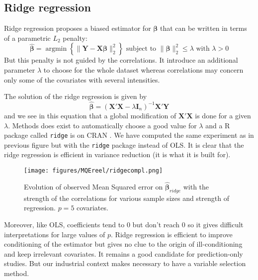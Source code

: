 \documentclass[12pt,a4paper]{report}
\begin{document}
		\subsection{Ridge regression}		%

Ridge regression \cite{hoerl1970ridge,marquardt1975ridge} proposes a biased estimator for $\boldsymbol{\beta}$ that can be written in terms of a parametric $L_2$ penalty:
	\begin{equation}
		 \boldsymbol{\hat{\beta}}=\operatorname{argmin} \left\lbrace \parallel \boldsymbol{Y}-\boldsymbol{X\beta}\parallel_2^2 \right\rbrace \textrm{ subject to } \parallel \boldsymbol{\beta} \parallel_2^2\leq \lambda \textrm{ with } \lambda>0
	\end{equation}
	But this penalty is not guided by the correlations. It introduce an additional parameter $\lambda$ to choose for the whole dataset  whereas correlations may concern only some of the covariates with several intensities.
	
	The solution of the ridge regression is given by
	\begin{equation}
		 \hat{\boldsymbol{\beta}}=\left(\boldsymbol{X}'\boldsymbol{X} -\lambda\boldsymbol{I}_n\right) ^{-1}\boldsymbol{X}'\boldsymbol{Y}\label{betaridge}
	\end{equation}
	and we see in this equation that a global modification of $\boldsymbol{X}'\boldsymbol{X}$ is done for a given $\lambda$. Methods does exist to automatically choose a good value for $\lambda$ \cite{cule2013ridge,er2013systematic} and a R package called {\tt ridge} is on CRAN \cite{packageridge}. 
	We have computed the same experiment as in previous figure but with the {\tt ridge} package instead of OLS. It is clear that the ridge regression is efficient in variance reduction (it is what it is built for).
	 \begin{figure}
	 \centering
	  \texttt{[image: figures/MQEreel/ridgecompl.png]}
	  \caption{Evolution of observed Mean Squared error on $\hat{\boldsymbol{\beta}}_{ridge}$ with the strength of the correlations for various sample sizes and strength of regression. $p=5$ covariates. } \label{MQEridgecompl}
	\end{figure}
	
	
	Moreover, like OLS, coefficients tend to 0 but don't reach 0 so it gives difficult interpretations for large values of $p$. Ridge regression is efficient to improve conditioning of the estimator but gives no clue to the origin of ill-conditioning and keep irrelevant covariates. It remains a good candidate for prediction-only studies. But our industrial context makes necessary to have a variable selection method.
	
\end{document}

